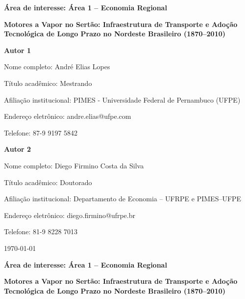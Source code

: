 \documentclass[12pt,a4paper]{article}
\newcommand{\titulo}{Motores a Vapor no Sertão: Infraestrutura de Transporte e Adoção Tecnológica de Longo Prazo no Nordeste Brasileiro (1870--2010)}
\newcommand{\area}{Área de interesse: Área 1 -- Economia Regional}
\begin{document}

\begin{titlepage}
\thispagestyle{empty}
\begin{center}
\textbf{\area}

\vspace{1.2cm}

{\bfseries\titulo\par}
\end{center}

\vspace{1.2cm}

\noindent\textbf{Autor 1}\par
\noindent Nome completo: André Elias Lopes\par
\noindent Título acadêmico: Mestrando\par
\noindent Afiliação institucional: PIMES - Universidade Federal de Pernambuco (UFPE)\par
\noindent Endereço eletrônico: andre.elias@ufpe.com\par
\noindent Telefone: 87-9 9197 5842\par


\vspace{0.8cm}

\noindent\textbf{Autor 2}\par
\noindent Nome completo: Diego Firmino Costa da Silva\par
\noindent Título acadêmico: Doutorado\par
\noindent Afiliação institucional: Departamento de Economia -- UFRPE e PIMES--UFPE\par
\noindent Endereço eletrônico: diego.firmino@ufrpe.br\par
\noindent Telefone: 81-9 8228 7013\par


\vfill
\begin{center}
\today
\end{center}
\end{titlepage}

\newpage
\setcounter{page}{1}
\thispagestyle{plain}

\begin{center}
\textbf{\area}

\vspace{0.8cm}

{\bfseries\titulo\par}
\end{center}

\vspace{0.5cm}
\end{document}
